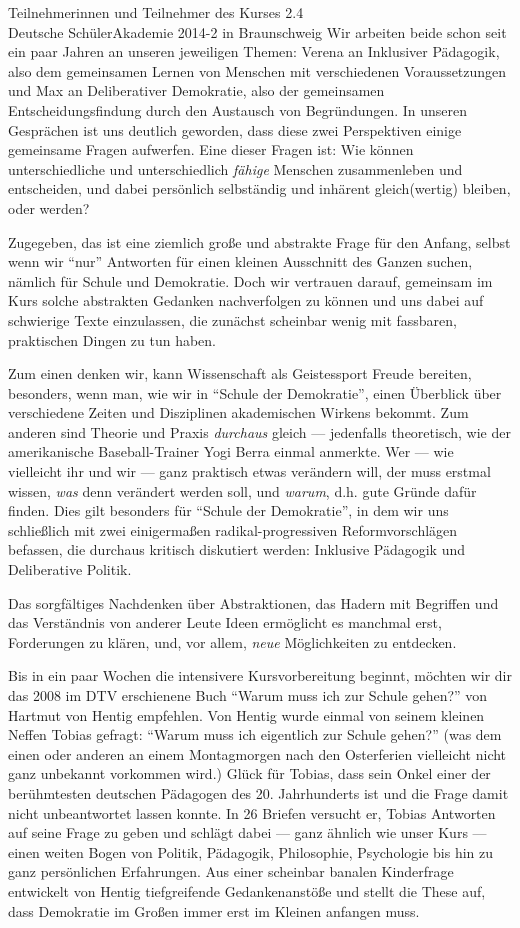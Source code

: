 \documentclass[a4paper]{letter}
\begin{document}
\begin{letter}{
	Teilnehmerinnen und Teilnehmer des Kurses 2.4 \\
	Deutsche SchülerAkademie 2014-2 in Braunschweig}
Wir arbeiten beide schon seit ein paar Jahren an unseren jeweiligen Themen: Verena an Inklusiver Pädagogik, also dem gemeinsamen Lernen von Menschen mit verschiedenen Voraussetzungen und Max an Deliberativer Demokratie, also der gemeinsamen Entscheidungsfindung durch den Austausch von Begründungen.
In unseren Gesprächen ist uns deutlich geworden, dass diese zwei Perspektiven einige gemeinsame Fragen aufwerfen.
Eine dieser Fragen ist:
Wie können unterschiedliche und unterschiedlich \emph{fähige} Menschen zusammenleben und entscheiden, und dabei persönlich selbständig und inhärent gleich(wertig) bleiben, oder werden?

Zugegeben, das ist eine ziemlich große und abstrakte Frage für den Anfang, selbst wenn wir "`nur"' Antworten für einen kleinen Ausschnitt des Ganzen suchen, nämlich für Schule und Demokratie.
Doch wir vertrauen darauf, gemeinsam im Kurs solche abstrakten Gedanken nachverfolgen zu können und uns dabei auf schwierige Texte einzulassen, die zunächst scheinbar wenig mit fassbaren, praktischen Dingen zu tun haben.

Zum einen denken wir, kann Wissenschaft als Geistessport Freude bereiten, besonders, wenn man, wie wir in "`Schule der Demokratie"', einen Überblick über verschiedene Zeiten und Disziplinen akademischen Wirkens bekommt.
Zum anderen sind Theorie und Praxis \emph{durchaus} gleich --- jedenfalls theoretisch, wie der amerikanische Baseball-Trainer Yogi Berra einmal anmerkte.
Wer --- wie vielleicht ihr und wir --- ganz praktisch etwas verändern will, der muss erstmal wissen, \emph{was} denn verändert werden soll, und \emph{warum}, d.h. gute Gründe dafür finden.
Dies gilt besonders für "`Schule der Demokratie"', in dem wir uns schließlich mit zwei einigermaßen radikal-progressiven Reformvorschlägen befassen, die durchaus kritisch diskutiert werden: Inklusive Pädagogik und Deliberative Politik.

Das sorgfältiges Nachdenken über Abstraktionen, das Hadern mit Begriffen und das Verständnis von anderer Leute Ideen ermöglicht es manchmal erst, Forderungen zu klären, und, vor allem, \emph{neue} Möglichkeiten zu entdecken.

Bis in ein paar Wochen die intensivere Kursvorbereitung beginnt, möchten wir dir das 2008 im DTV erschienene Buch "`Warum muss ich zur Schule gehen?"' von Hartmut von Hentig empfehlen.
Von Hentig wurde einmal von seinem kleinen Neffen Tobias gefragt: "`Warum muss ich eigentlich zur Schule gehen?"' (was dem einen oder anderen an einem Montagmorgen nach den Osterferien vielleicht nicht ganz unbekannt vorkommen wird.)
Glück für Tobias, dass sein Onkel einer der berühmtesten deutschen Pädagogen des 20. Jahrhunderts ist und die Frage damit nicht unbeantwortet lassen konnte.
In 26 Briefen versucht er, Tobias Antworten auf seine Frage zu geben und schlägt dabei --- ganz ähnlich wie unser Kurs --- einen weiten Bogen von Politik, Pädagogik, Philosophie, Psychologie bis hin zu ganz persönlichen Erfahrungen.
Aus einer scheinbar banalen Kinderfrage entwickelt von Hentig tiefgreifende Gedankenanstöße und stellt die These auf, dass Demokratie im Großen immer erst im Kleinen anfangen muss.


\end{letter}
\end{document}
